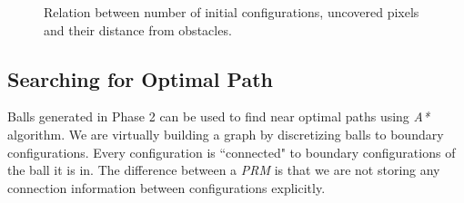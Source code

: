 \documentclass[11pt]{article}
\begin{document}
\begin{figure}
	\caption{\label{uncovered}} Relation between number of initial configurations, uncovered pixels and their distance from obstacles.
\end{figure}

\subsection{Searching for Optimal Path}

\indent\indent Balls generated in Phase 2 can be used to find near optimal paths using \emph{A*} algorithm. We are virtually building a graph by discretizing balls to boundary configurations. Every configuration is ``connected" to boundary configurations of the ball it is in. The difference between a \emph{PRM} is that we are not storing any connection information between configurations explicitly.  
\end{document}
